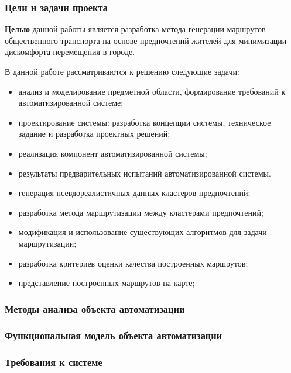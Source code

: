 \begin{frame}
    \frametitle{Цели и задачи проекта}
    \textbf{Целью} данной работы является разработка метода генерации маршрутов общественного 
    транспорта на основе предпочтений жителей для минимизации дискомфорта перемещения в городе.

    В данной работе рассматриваются к решению следующие задачи:
    \begin{itemize}\itemsep-5pt
        \item анализ и моделирование предметной области, формирование требований к 
            автоматизированной системе;
        \item проектирование системы: разработка концепции системы, техническое задание и 
            разработка проектных решений;
        \item реализация компонент автоматизированной системы;
        \item результаты предварительных испытаний автоматизированной системы.
        \item генерация псевдореалистичных данных кластеров предпочтений;
        \item разработка метода маршрутизации между кластерами предпочтений;
        \item модификация и использование существующих алгоритмов для задачи маршрутизации;
        \item разработка критериев оценки качества построенных маршрутов;
        \item представление построенных маршрутов на карте;
    \end{itemize}
\end{frame}

\begin{frame}
    \frametitle{Методы анализа объекта автоматизации}
\end{frame}

\begin{frame}
    \frametitle{Функциональная модель объекта автоматизации}
\end{frame}

\begin{frame}
    \frametitle{Требования к системе}
\end{frame}

